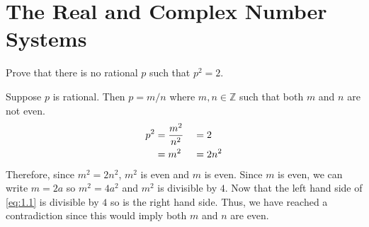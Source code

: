 \chapter{The Real and Complex Number Systems}
\label{ch1}

Prove that there is no rational \(p\) such that \(p^2 = 2\).
\par\smallskip
Suppose \(p\) is rational. Then \(p = m/n\) where \(m, n\in\mathbb{Z}\) such that both \(m\) and \(n\) are not even.
\begin{alignat}{3}
	p^2 &= \frac{m^2}{n^2} &&= 2\notag\\
	&= m^2 &&= 2n^2 \label{eq:1.1}
\end{alignat}
Therefore, since \(m^2 = 2n^2\), \(m^2\) is even and \(m\) is even. Since \(m\) is even, we can write \(m = 2a\) so
\(m^2 = 4a^2\) and \(m^2\) is divisible by \(4\). Now that the left hand side of \cref{eq:1.1} is divisible by 
\(4\) so is the right hand side. Thus, we have reached a contradiction since this would imply both \(m\) and \(n\) 
are even.